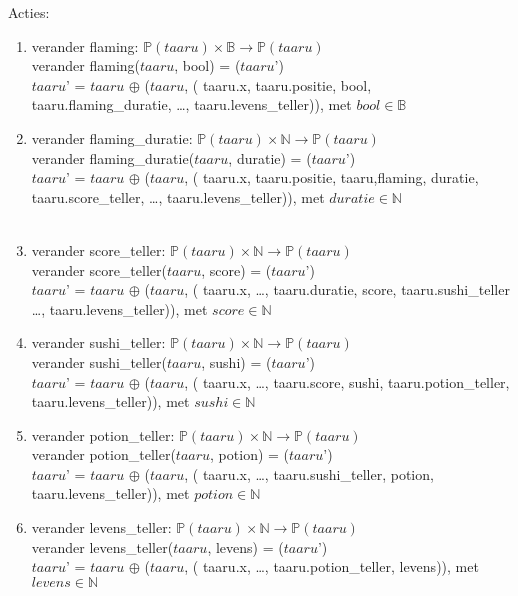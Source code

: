 Acties:
\begin{enumerate}
    \item verander flaming: $\mathbb{P}(taaru) \times \mathbb{B} \rightarrow \mathbb{P}(taaru) $ \\
verander flaming($taaru$, bool) = ($taaru$') \\
$taaru$' = $taaru$ $\oplus$ ($taaru$, ( taaru.x, taaru.positie, bool, taaru.flaming\_duratie, \ldots, taaru.levens\_teller)), met $bool \in \mathbb{B}$ \\
    \item verander flaming\_duratie:  $\mathbb{P}(taaru) \times \mathbb{N} \rightarrow \mathbb{P}(taaru) $ \\
    verander flaming\_duratie($taaru$, duratie) = ($taaru$') \\
    $taaru$' = $taaru$ $\oplus$ ($taaru$, ( taaru.x, taaru.positie, taaru,flaming, duratie, taaru.score\_teller, \ldots, taaru.levens\_teller)), met $duratie \in \mathbb{N}$ \\
     \\  \item verander score\_teller: $\mathbb{P}(taaru) \times \mathbb{N} \rightarrow \mathbb{P}(taaru)$ \\
    verander score\_teller($taaru$, score) = ($taaru$') \\
    $taaru$' = $taaru$ $\oplus$ ($taaru$, ( taaru.x, \ldots , taaru.duratie, score, taaru.sushi\_teller \ldots, taaru.levens\_teller)), met $score \in \mathbb{N}$ \\

\item verander sushi\_teller: $\mathbb{P}(taaru) \times \mathbb{N} \rightarrow \mathbb{P}(taaru)$ \\
    verander sushi\_teller($taaru$, sushi) = ($taaru$') \\
    $taaru$' = $taaru$ $\oplus$ ($taaru$, ( taaru.x, \ldots , taaru.score, sushi, taaru.potion\_teller, taaru.levens\_teller)), met $sushi \in \mathbb{N}$ \\
    \item verander potion\_teller: $\mathbb{P}(taaru) \times \mathbb{N} \rightarrow \mathbb{P}(taaru)$ \\
    verander potion\_teller($taaru$, potion) = ($taaru$') \\
    $taaru$' = $taaru$ $\oplus$ ($taaru$, ( taaru.x, \ldots , taaru.sushi\_teller, potion, taaru.levens\_teller)), met $potion \in \mathbb{N}$ \\

    \item verander levens\_teller: $\mathbb{P}(taaru) \times \mathbb{N} \rightarrow \mathbb{P}(taaru)$ \\
    verander levens\_teller($taaru$, levens) = ($taaru$') \\
    $taaru$' = $taaru$ $\oplus$ ($taaru$, ( taaru.x, \ldots , taaru.potion\_teller, levens)), met $levens \in \mathbb{N}$ \\

\end{enumerate}

